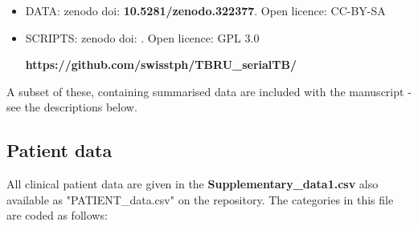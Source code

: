 \documentclass[12pt, oneside]{article}   	%
\begin{document}
\begin{itemize}
  \item DATA: zenodo doi: \textbf{10.5281/zenodo.322377}. Open licence: CC-BY-SA
  \item SCRIPTS: zenodo doi: . Open licence: GPL 3.0

  \textbf{https://github.com/swisstph/TBRU\_serialTB/}
\end{itemize}

\noindent A subset of these, containing summarised data are included with the manuscript - see the descriptions below.

\subsection{Patient data}
All clinical patient data are given in the \textbf{Supplementary\_data1.csv} also available as "PATIENT\_data.csv" on the repository.
The categories in this file are coded as follows:
\end{document}
